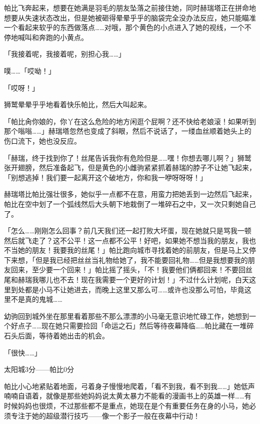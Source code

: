 帕比飞奔起来，想要在她满是羽毛的朋友坠落之前接住她，同时赫瑞塔正在拼命地想要从失速状态改出，但是她被砸得晕晕乎乎的脑袋完全没办法反应，她只能瞄准一个看起来软乎的东西做落点……对哦，那个黄色的小点进入了她的视线，一个不停地喊叫和奔跑的小黄点。

「我接着呢，我接着呢，别担心我……」

噗……「哎呦！」

「哎呀！」

狮鹫晕晕乎乎地看着快乐帕比，然后大叫起来。

「帕比肏你娘的，你丫在这么危险的地方闲逛个屁啊？还不快给老娘滚！如果听到那个嗡嗡……」赫瑞塔忽然也变成了斜眼，然后不说话了，一缕血丝顺着她头上的伤口流下，她也没反应。

「赫瑞，终于找到你了！丝尾告诉我你有危险但是……嘿！你想去哪儿啊？」狮鹫张开翅膀，然后准备起飞，但是黄色的小雌驹紧紧抓着赫瑞的脖子不让她飞起来，「别想逃掉！我们要一起离开这个破地方，你和我一咿呀呀呀！」

赫瑞塔比帕比强壮很多，她似乎一点都不在意，用蛮力把她丢到一边然后飞起来，帕比在空中划了一个弧线然后大头朝下地栽倒了一堆碎石之中，又一次只剩她自己了。

「怎么……刚刚怎么回事？前几天我们还一起打败大坏蛋，现在她就只是骂我一顿然后就飞走了？这不公平！这一点都不公平！好吧，如果她不想当我的朋友，我也不当她的朋友！我要我的丝尾！」帕比跑向城市寻找着她的前朋友，但是马上又停下来想，「但是我已经把丝丝当礼物给她了，我不能要回礼物……但是我想要我的朋友回来，至少要一个回来！」帕比摇了摇头，「不！我要他们俩都回来！不要回丝尾和赫瑞我哪儿也不去！现在我需要一个更好的计划！」不过什么计划呢，白天这里到处都是小马不让她进去，而晚上这里又那么可……或许也没那么可怕，毕竟这里不是真的鬼城……

幼驹回到城外坐在那里看着那些不那么漂漂的小马毫无意识地忙碌工作，她想到一个好点子……现在她只需要捡回「命运之石」然后等待夜幕降临……帕比藏在一堆碎石头后面，等待着她出击的机会。

「很快……」

\begin{center}
太阳城3分——帕比0分
\end{center}

\horizonline


帕比小心地紧贴着地面，弓着身子慢慢地爬着，「看不到我，看不到我……」她低声喃喃自语着，就像是那些她妈妈说太黄太暴力不能看的漫画书上的英雄一样……有时候妈妈也很烦，不过那些都不是重点，她现在是个有重要任务在身的小马，她必须专注于她的超级潜行技巧——像一个影子一般在夜幕中行动！

